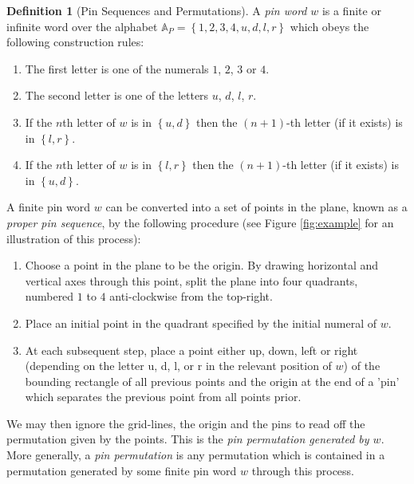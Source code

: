 \documentclass[11pt,a4paper]{article}
\newcommand{\plotptradius}{4pt}
\theoremstyle{definition}
\newtheorem{defn}[thm]{Definition}
\begin{document}
\begin{defn}[Pin Sequences and Permutations]
A \emph{pin word} $w$ is a finite or infinite word over the alphabet $\mathbb{A}_{P} = \left\{1,2,3,4,u,d,l,r\right\}$ which obeys the following construction rules:
\begin{enumerate}
\item The first letter is one of the numerals $1$, $2$, $3$ or $4$.
\item The second letter is one of the letters $u$, $d$, $l$, $r$.
\item If the $n$th letter of $w$ is in $\left\{u,d\right\}$ then the $(n+1)$-th letter (if it exists) is in $\left\{l,r\right\}$.
\item If the $n$th letter of $w$ is in $\left\{l,r\right\}$ then the $(n+1)$-th letter (if it exists) is in $\left\{u,d\right\}$.
\end{enumerate}

A finite pin word $w$ can be converted into a set of points in the plane, known as a \emph{proper pin sequence}, by the following procedure (see Figure \ref{fig:example} for an illustration of this process):

\begin{enumerate}
\item Choose a point in the plane to be the origin. By drawing horizontal and vertical axes through this point, split the plane into four quadrants, numbered $1$ to $4$ anti-clockwise from the top-right.
\item Place an initial point in the quadrant specified by the initial numeral of $w$.
\item At each subsequent step, place a point either up, down, left or right (depending on the letter u, d, l, or r in the relevant position of $w$) of the bounding rectangle of all previous points and the origin at the end of a 'pin' which separates the previous point from all points prior.
\end{enumerate}

We may then ignore the grid-lines, the origin and the pins to read off the permutation given by the points. This is the \emph{pin permutation generated by $w$}. More generally, a \emph{pin permutation} is any permutation which is contained in a permutation generated by some finite pin word $w$ through this process.

\begin{figure}[h]
\begin{center}
\end{center}
\end{figure}
\end{defn}
\end{document}
